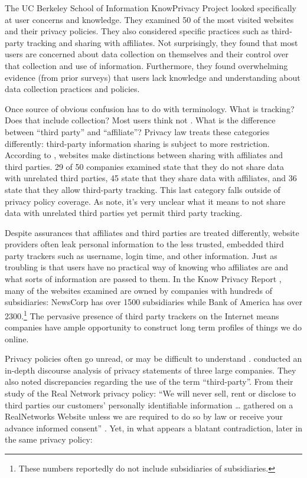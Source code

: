 The UC Berkeley School of Information KnowPrivacy Project  \citep{Gomez:2009ue}  looked specifically at user concerns and knowledge. They examined 50 of the most visited websites and their privacy policies. They also considered specific practices such as third-party tracking and sharing with affiliates. Not surprisingly, they found that most users are concerned about data collection on themselves and their control over that collection and use of information. Furthermore, they found overwhelming evidence (from prior surveys) that users lack knowledge and understanding about data collection practices and policies.

Once source of obvious confusion has to do with terminology. What is tracking? Does that include collection? Most users think not  \citep{McDonald:2011vx, McDonald:2011uv}.  What is the difference between ``third party'' and ``affiliate''? Privacy law treats these categories differently: third-party information sharing is subject to more restriction. According to  \cite{Gomez:2009ue},  websites make distinctions between sharing with affiliates and third parties. 29 of 50 companies examined state that they do not share data with unrelated third parties, 45 state that they share data with affiliates, and 36 state that they allow third-party tracking. This last category falls outside of privacy policy coverage. As  \cite{Gomez:2009ue}  note, it's very unclear what it means to not share data with unrelated third parties yet permit third party tracking.

Despite assurances that affiliates and third parties are treated differently, website providers often leak personal information to the less trusted, embedded third party trackers such as username, login time, and other information. Just as troubling is that users have no practical way of knowing who affiliates are and what sorts of information are passed to them. In the Know Privacy Report  \citeyearpar{Gomez:2009ue},  many of the websites examined are owned by companies with hundreds of subsidiaries: NewsCorp has over 1500 subsidiaries while Bank of America has over  2300.\footnote{These numbers reportedly do not include subsidiaries of subsidiaries.}  The pervasive presence of third party trackers on the Internet means companies have ample opportunity to construct long term profiles of things we do online.

Privacy policies often go unread, or may be difficult to understand  \citep{Milne:2004dy, Sherman:2008uz}.   \cite{Fernback:2007bq}  conducted an in-depth discourse analysis of privacy statements of three large companies. They also noted discrepancies regarding the use of the term ``third-party''. From their study of the Real Network privacy policy: ``We will never sell, rent or disclose to third parties our customers' personally identifiable information {\ldots} gathered on a RealNetworks Website unless we are required to do so by law or receive your advance informed consent''  \citep{Fernback:2007bq}.  Yet, in what appears a blatant contradiction, later in the same privacy policy:

